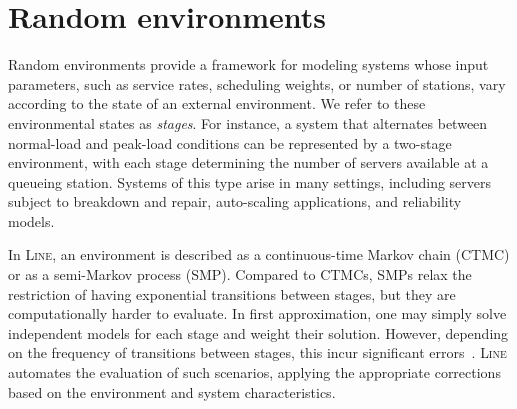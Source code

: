 %


\chapter{Random environments}
\label{Random-environments}
Random environments provide a framework for modeling systems whose input parameters, such as service rates, scheduling weights, or number of stations, vary according to the state of an external environment. We refer to these environmental states as \textit{stages}. For instance, a system that alternates between normal-load and peak-load conditions can be represented by a two-stage environment, with each stage determining the number of servers available at a queueing station. Systems of this type arise in many settings, including servers subject to breakdown and repair, auto-scaling applications, and reliability models.

In \textsc{Line}, an environment is described as a continuous-time Markov chain (CTMC) or as a semi-Markov process (SMP). Compared to CTMCs, SMPs relax the restriction of having exponential transitions between stages, but they are computationally harder to evaluate. In first approximation, one may simply solve independent models for each stage and weight their solution. However, depending on the frequency of transitions between stages, this incur significant errors~\cite{CasTH14}. \textsc{Line} automates the evaluation of such scenarios, applying the appropriate corrections based on the environment and system characteristics. 

